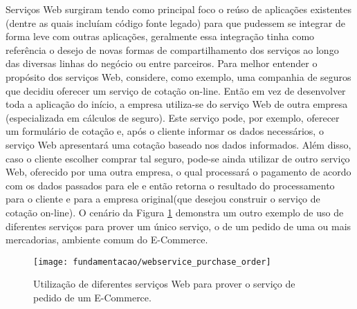 Serviços Web surgiram tendo como principal foco o reúso de aplicações existentes (dentre as quais incluíam código fonte legado) para que pudessem se integrar de forma leve com outras aplicações, geralmente essa integração tinha como referência o desejo de  novas formas de compartilhamento dos serviços ao longo das diversas linhas do negócio ou entre parceiros. Para melhor entender o propósito dos serviços Web, considere, como exemplo, uma companhia de seguros que decidiu oferecer um serviço de cotação on-line. Então em vez de desenvolver toda a aplicação do início, a empresa utiliza-se do serviço Web de outra empresa (especializada em cálculos de seguro). Este serviço pode, por exemplo, oferecer um formulário de cotação e, após o cliente informar os dados necessários, o serviço Web apresentará uma cotação baseado nos dados informados. Além disso, caso o cliente escolher comprar tal seguro, pode-se ainda utilizar de outro serviço Web, oferecido por uma outra empresa, o qual processará o pagamento de acordo com os dados passados para ele e então retorna o resultado do processamento para o cliente e para a empresa original(que desejou construir o serviço de cotação on-line)\cite{Papazoglou:2008}. O cenário da Figura \ref{fig:ws_purchase_order} demonstra um outro exemplo de uso de diferentes serviços para prover um único serviço, o de um pedido de uma ou mais mercadorias, ambiente comum do E-Commerce.

\begin{figure}[!htb] \centering 
  \centering
  \texttt{[image: fundamentacao/webservice\_purchase\_order]} 
  \caption{Utilização de diferentes serviços Web para prover o serviço de pedido de um E-Commerce.\cite{Papazoglou:2008}} 
  \label{fig:ws_purchase_order}
\end{figure}

